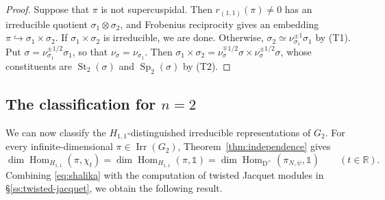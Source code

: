 \documentclass[11pt]{amsart}
\numberwithin{equation}{section}
\theoremstyle{plain}
\theoremstyle{definition}
\theoremstyle{remark}
\newcommand{\R}{\mathbb{R}}
\newcommand{\one}{\mathds{1}}
\DeclareMathOperator{\Hom}{Hom}
\DeclareMathOperator{\Irr}{Irr}
\DeclareMathOperator{\St}{St}
\DeclareMathOperator{\Sp}{Sp}
\begin{document}
\begin{proof}
	Suppose that $\pi$ is not supercuspidal. Then $r_{(1,1)}(\pi)\ne0$ has an irreducible quotient $\sigma_1\otimes\sigma_2$, and Frobenius reciprocity gives an embedding $\pi\hookrightarrow\sigma_1\times\sigma_2$. If $\sigma_1\times\sigma_2$ is irreducible, we are done. Otherwise, $\sigma_2\simeq\nu_{\sigma_1}^{\pm1}\sigma_1$ by (T1). Put $\sigma=\nu_{\sigma_1}^{\pm1/2}\sigma_1$, so that $\nu_\sigma=\nu_{\sigma_1}$. Then $\sigma_1\times\sigma_2=\nu_\sigma^{\mp1/2}\sigma\times\nu_\sigma^{\pm1/2}\sigma$, whose constituents are $\St_2(\sigma)$ and $\Sp_2(\sigma)$ by (T2).
\end{proof}

\subsection{The classification for \texorpdfstring{$n=2$}{n=2}}\label{ss:rank2-classification}

We can now classify the $H_{1,1}$-distinguished irreducible representations of $G_2$. For every infinite-dimensional $\pi\in\Irr(G_2)$, Theorem~\ref{thm:independence} gives
\begin{equation}\label{eq:shalika}
	\dim\Hom_{H_{1,1}}(\pi,\chi_t)=\dim\Hom_{H_{1,1}}(\pi,\one)=\dim\Hom_{\mathrm{D}^\times}(\pi_{N,\psi},\one)\qquad(t\in\R).
\end{equation}
Combining \eqref{eq:shalika} with the computation of twisted Jacquet modules in \S\ref{ss:twisted-jacquet}, we obtain the following result.
\end{document}
